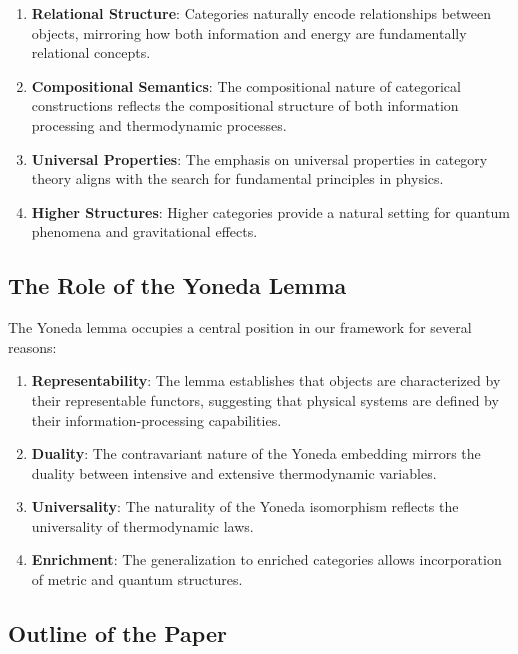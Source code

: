 \documentclass[12pt]{article}
\begin{document}
\begin{enumerate}
\item \textbf{Relational Structure}: Categories naturally encode relationships between objects, mirroring how both information and energy are fundamentally relational concepts.

\item \textbf{Compositional Semantics}: The compositional nature of categorical constructions reflects the compositional structure of both information processing and thermodynamic processes.

\item \textbf{Universal Properties}: The emphasis on universal properties in category theory aligns with the search for fundamental principles in physics.

\item \textbf{Higher Structures}: Higher categories provide a natural setting for quantum phenomena and gravitational effects.
\end{enumerate}

\subsection{The Role of the Yoneda Lemma}

The Yoneda lemma occupies a central position in our framework for several reasons:

\begin{enumerate}
\item \textbf{Representability}: The lemma establishes that objects are characterized by their representable functors, suggesting that physical systems are defined by their information-processing capabilities.

\item \textbf{Duality}: The contravariant nature of the Yoneda embedding mirrors the duality between intensive and extensive thermodynamic variables.

\item \textbf{Universality}: The naturality of the Yoneda isomorphism reflects the universality of thermodynamic laws.

\item \textbf{Enrichment}: The generalization to enriched categories allows incorporation of metric and quantum structures.
\end{enumerate}

\subsection{Outline of the Paper}
\end{document}
